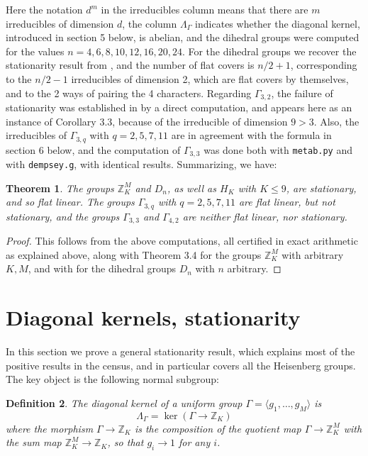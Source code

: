 \documentclass[12pt]{amsart}
\newtheorem{theorem}{Theorem}[section]
\newtheorem{definition}[theorem]{Definition}
\theoremstyle{definition}
\begin{document}
Here the notation $d^m$ in the irreducibles column means that there are $m$ irreducibles of dimension $d$, the column $\Lambda_\Gamma$ indicates whether the diagonal kernel, introduced in section 5 below, is abelian, and the dihedral groups were computed for the values $n=4,6,8,10,12,16,20,24$. For the dihedral groups we recover the stationarity result from \cite{bc2}, and the number of flat covers is $n/2+1$, corresponding to the $n/2-1$ irreducibles of dimension 2, which are flat covers by themselves, and to the 2 ways of pairing the 4 characters. Regarding $\Gamma_{3,2}$, the failure of stationarity was established in \cite{bc2} by a direct computation, and appears here as an instance of Corollary 3.3, because of the irreducible of dimension $9>3$. Also, the irreducibles of $\Gamma_{3,q}$ with $q=2,5,7,11$ are in agreement with the formula in section 6 below, and the computation of $\Gamma_{3,3}$ was done both with {\tt metab.py} and with {\tt dempsey.g}, with identical results. Summarizing, we have:

\begin{theorem}
The groups $\mathbb Z_K^M$ and $D_n$, as well as $H_K$ with $K\leq9$, are stationary, and so flat linear. The groups $\Gamma_{3,q}$ with $q=2,5,7,11$ are flat linear, but not stationary, and the groups $\Gamma_{3,3}$ and $\Gamma_{4,2}$ are neither flat linear, nor stationary.
\end{theorem}

\begin{proof}
This follows from the above computations, all certified in exact arithmetic as explained above, along with Theorem 3.4 for the groups $\mathbb Z_K^M$ with arbitrary $K,M$, and with \cite{bc2} for the dihedral groups $D_n$ with $n$ arbitrary.
\end{proof}

\section{Diagonal kernels, stationarity}

In this section we prove a general stationarity result, which explains most of the positive results in the census, and in particular covers all the Heisenberg groups. The key object is the following normal subgroup:

\begin{definition}
The diagonal kernel of a uniform group $\Gamma=\langle g_1,\ldots,g_M\rangle$ is
$$\Lambda_\Gamma=\ker\left(\Gamma\to\mathbb Z_K\right)$$
where the morphism $\Gamma\to\mathbb Z_K$ is the composition of the quotient map $\Gamma\to\mathbb Z_K^M$ with the sum map $\mathbb Z_K^M\to\mathbb Z_K$, so that $g_i\to1$ for any $i$.
\end{definition}
\end{document}
